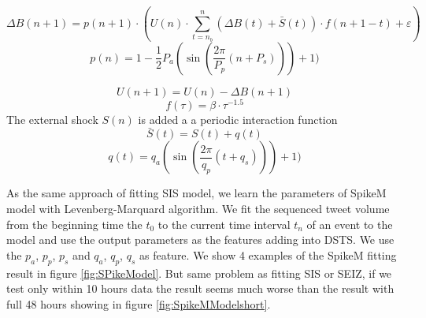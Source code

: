 \begin{equation}
\Delta B(n + 1) =p(n + 1)\cdot( U(n) \cdot  \sum ^n_{t=n_b}(\Delta B(t) +  \bar{S}(t))\cdot f(n+1-t) + \varepsilon )
\end{equation}
\begin{equation}
\label{periodic}
p(n) = 1-\frac{1}{2}P_a(\sin (\frac{2\pi}{P_p} (n+P_s)))+1)
\end{equation}

\begin{equation}
U(n + 1)=U(n)-\Delta {B(n + 1) }
\end{equation}
\begin{equation}
\label{decay}
f(\tau)=\beta \cdot \tau ^{-1.5}
\end{equation}
The external shock $S(n)$ is added a a periodic interaction function
\begin{equation}
\label{outs}
\bar{S}(t)=S(t)+q(t)
\end{equation}
\begin{equation}
q(t) =  q_a(\sin (\frac{2\pi}{q_p} (t+q_s)))+1)
\end{equation}


\begin{table}[!h]
 \centering
{}
\caption{New Parameters of extended SpikeM}
\label{tab:Features_Impsortance2}
\end{table}
As the same approach of fitting SIS model, we learn the parameters of SpikeM model with Levenberg-Marquard algorithm. We fit the sequenced tweet volume from the beginning time the $t_0$ to the current time interval $t_n$ of an event to the model and use the output parameters as the features adding into DSTS. We use the $p_a$,  $p_p$, $p_s$ and $q_a$, $q_p$, $q_s$ as feature. We show 4 examples of the SpikeM fitting result in figure \ref{fig:SPikeModel}. But same problem as fitting SIS or SEIZ, if we test only within 10 hours data the result seems much worse than the result with full 48 hours showing in figure \ref{fig:SpikeMModelshort}.

